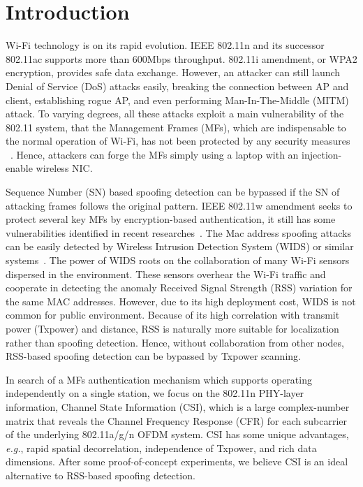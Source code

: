 \documentclass[conference]{IEEEtran}
\def\eg{\textit{e.g.}\xspace}
\begin{document}
\section{Introduction}
\label{sec:introduction}


Wi-Fi technology is on its rapid evolution. IEEE 802.11n and its successor 802.11ac supports more than
600Mbps throughput. 802.11i amendment, or WPA2 encryption, provides safe data exchange. However, an attacker  can still launch Denial of Service (DoS) attacks\cite{bellardo2003802,yang2006scan,pelechrinis2010denial} easily, breaking the connection between AP
and client, establishing rogue AP, and even performing
Man-In-The-Middle (MITM) attack.
To varying degrees, all these attacks exploit a main vulnerability of the 802.11 system, that the
 Management Frames (MFs), which are indispensable to the normal operation of Wi-Fi, has not been protected by any security measures ~\cite{arbaugh2002your}. Hence, attackers can forge the MFs simply using a laptop with an injection-enable wireless NIC.

Sequence Number (SN) based spoofing detection can be bypassed if the SN of attacking frames follows the original pattern. IEEE 802.11w amendment seeks to protect several key MFs by encryption-based authentication, it still has some vulnerabilities identified in recent researches~\cite{ahmad2011short,80211winfocom}.
The Mac address spoofing attacks can be easily detected by Wireless Intrusion
 Detection System (WIDS) or similar
 systems~\cite{sheng2008detecting,chumchu2011new,yang2012detection}.
 The power of WIDS roots on the collaboration of many Wi-Fi sensors dispersed in the environment.
These sensors overhear the Wi-Fi traffic and cooperate in
 detecting the anomaly Received Signal Strength (RSS) variation for the same MAC addresses. However, due to its high deployment cost, WIDS is not common for public environment.
Because of its high correlation with transmit power (Txpower) and distance, RSS is naturally more suitable for localization ~\cite{bo2012locating,xi2010locating,liu2010location,wu2012will} rather than spoofing detection. Hence, without collaboration from other nodes, RSS-based spoofing detection can be bypassed by Txpower scanning.

In search of a MFs authentication mechanism which supports operating independently on a single station,
we focus on the 802.11n PHY-layer information, Channel State Information (CSI), which is a large complex-number matrix that reveals the Channel Frequency Response (CFR) for each subcarrier of the underlying 802.11a/g/n OFDM system. CSI has some unique advantages, \eg, rapid spatial decorrelation, independence of Txpower, and rich data dimensions. After some proof-of-concept experiments, we believe CSI is an ideal alternative to RSS-based spoofing detection.
\end{document}

